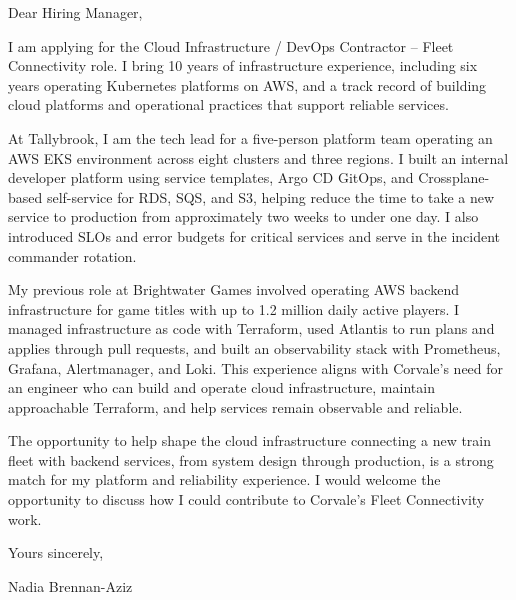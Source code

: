 \documentclass[11pt,a4paper]{article}
\begin{document}
Dear Hiring Manager,

I am applying for the Cloud Infrastructure / DevOps Contractor -- Fleet Connectivity role. I bring 10 years of infrastructure experience, including six years operating Kubernetes platforms on AWS, and a track record of building cloud platforms and operational practices that support reliable services.

At Tallybrook, I am the tech lead for a five-person platform team operating an AWS EKS environment across eight clusters and three regions. I built an internal developer platform using service templates, Argo CD GitOps, and Crossplane-based self-service for RDS, SQS, and S3, helping reduce the time to take a new service to production from approximately two weeks to under one day. I also introduced SLOs and error budgets for critical services and serve in the incident commander rotation.

My previous role at Brightwater Games involved operating AWS backend infrastructure for game titles with up to 1.2 million daily active players. I managed infrastructure as code with Terraform, used Atlantis to run plans and applies through pull requests, and built an observability stack with Prometheus, Grafana, Alertmanager, and Loki. This experience aligns with Corvale's need for an engineer who can build and operate cloud infrastructure, maintain approachable Terraform, and help services remain observable and reliable.

The opportunity to help shape the cloud infrastructure connecting a new train fleet with backend services, from system design through production, is a strong match for my platform and reliability experience. I would welcome the opportunity to discuss how I could contribute to Corvale's Fleet Connectivity work.

Yours sincerely,

Nadia Brennan-Aziz
\end{document}
